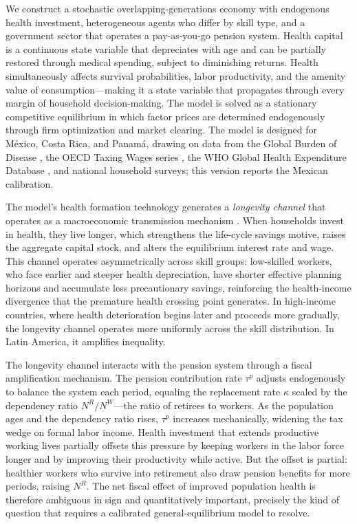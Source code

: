 \documentclass[12pt,a4paper]{article}
\begin{document}
We construct a stochastic overlapping-generations economy with endogenous health investment, heterogeneous agents who differ by skill type, and a government sector that operates a pay-as-you-go pension system. Health capital is a continuous state variable that depreciates with age and can be partially restored through medical spending, subject to diminishing returns. Health simultaneously affects survival probabilities, labor productivity, and the amenity value of consumption---making it a state variable that propagates through every margin of household decision-making. The model is solved as a stationary competitive equilibrium in which factor prices are determined endogenously through firm optimization and market clearing. The model is designed for M\'exico, Costa Rica, and Panam\'a, drawing on data from the Global Burden of Disease \citep{GBD2021}, the OECD Taxing Wages series \citep{OECDTaxingWages2026}, the WHO Global Health Expenditure Database \citep{WHOGHED2024}, and national household surveys; this version reports the Mexican calibration.

The model's health formation technology generates a \textit{longevity channel} that operates as a macroeconomic transmission mechanism \citep{Carrasco2026}. When households invest in health, they live longer, which strengthens the life-cycle savings motive, raises the aggregate capital stock, and alters the equilibrium interest rate and wage. This channel operates asymmetrically across skill groups: low-skilled workers, who face earlier and steeper health depreciation, have shorter effective planning horizons and accumulate less precautionary savings, reinforcing the health-income divergence that the premature health crossing point generates. In high-income countries, where health deterioration begins later and proceeds more gradually, the longevity channel operates more uniformly across the skill distribution. In Latin America, it amplifies inequality.

The longevity channel interacts with the pension system through a fiscal amplification mechanism. The pension contribution rate $\tau^p$ adjusts endogenously to balance the system each period, equaling the replacement rate $\kappa$ scaled by the dependency ratio $N^R/N^W$---the ratio of retirees to workers. As the population ages and the dependency ratio rises, $\tau^p$ increases mechanically, widening the tax wedge on formal labor income. Health investment that extends productive working lives partially offsets this pressure by keeping workers in the labor force longer and by improving their productivity while active. But the offset is partial: healthier workers who survive into retirement also draw pension benefits for more periods, raising $N^R$. The net fiscal effect of improved population health is therefore ambiguous in sign and quantitatively important, precisely the kind of question that requires a calibrated general-equilibrium model to resolve.
\end{document}
